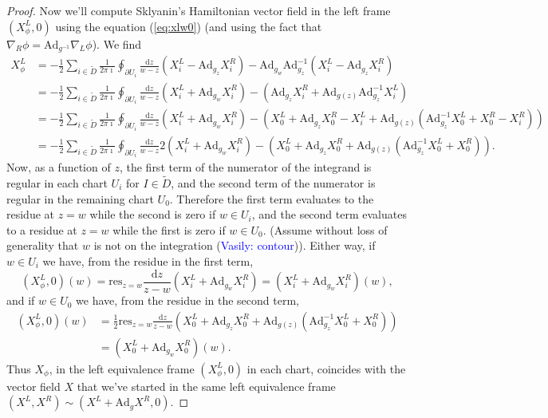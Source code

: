 \documentclass[11pt, oneside, reqno]{amsart}
\theoremstyle{definition} \newtheorem{definition}{Definition}[section]
\theoremstyle{definition} \newtheorem{remark}[definition]{Remark}
\theoremstyle{definition} \newtheorem{remarks}[definition]{Remarks}
\theoremstyle{definition} \newtheorem{question}[definition]{Question}
\theoremstyle{definition} \newtheorem*{note}{Note}
\theoremstyle{definition} \newtheorem{example}[definition]{Example}
\theoremstyle{definition} \newtheorem{examples}[definition]{Examples}
\newcommand{\mr}[1]{\mathrm{#1}}
\renewcommand{\d}{\mathrm{d}}
\newcommand{\Ad}{\mr{Ad}}
\newcommand{\vasily}[1]{(\textcolor{blue}{Vasily: #1})}
\begin{document}
\begin{proof}
Now we'll compute Sklyanin's Hamiltonian vector field in the left frame $(X_{\phi}^{L}, 0)$ using the equation (\ref{eq:xlw0}) (and using the fact that $\nabla_{R} \phi  = \Ad_{g^{-1}} \nabla_{L} \phi$).  We find
\begin{align*}
  X^{L}_\phi &= -\frac 1 2 \sum_{i \in \tilde D} \frac{1}{2 \pi \imath} \oint_{\partial U_i}
  \frac{\d z}{w - z}  (X_i^{L} - \Ad_{g_z} X_i^{R})  - \Ad_{g_w} \Ad_{g_z}^{-1} (X_i^{L} - \Ad_{g_z} X_i^{R}) \\
&=  -\frac 1 2 \sum_{i \in \tilde D} \frac{1}{2 \pi \imath} \oint_{\partial U_i}
\frac{\d z}{w - z}  (X_i^{L}  + \Ad_{g_w} X_i^{R}) - (\Ad_{g_z} X_i^{R} +  \Ad_{g(z)} \Ad_{g_{z}}^{-1} X_i^{L}) \\
 &= -\frac 1 2  \sum_{i \in \tilde D} \frac{1}{2 \pi \imath} \oint_{\partial U_i}
 \frac{\d z}{w - z}  (X_i^{L}  + \Ad_{g_w} X_i^{R}) - (X_0^{L} + \Ad_{g_z} X_0^{R}- X_{i}^{L} +  \Ad_{g(z)} ( \Ad_{g_{z}}^{-1} X_0^{L} + X_0^{R} - X_{i}^{R})) \\
  &= -\frac 1 2  \sum_{i \in \tilde D} \frac{1}{2 \pi \imath} \oint_{\partial U_i}
    \frac{\d z}{w - z} 2 (X_i^{L}  + \Ad_{g_w} X_i^{R}) - (X_0^{L} + \Ad_{g_z} X_0^{R} +  \Ad_{g(z)} ( \Ad_{g_{z}}^{-1} X_0^{L} + X_0^{R} )).
  \end{align*}
Now, as a function of $z$, the first term of the numerator of the integrand is regular in each chart $U_i$ for $I \in \tilde D$, and the second term of the numerator is regular in the remaining chart $U_0$. Therefore the first term evaluates to the residue at $z = w$ while the second is zero if $w \in U_i$, and the second term evaluates to a residue at $z = w$ while the first is zero if $w \in U_0$. (Assume without loss of generality that $w$ is not on the integration \vasily{contour}).  Either way, if $w \in U_i$ we have, from the residue in the first term,
  \[
    (X^{L}_\phi, 0)(w) = \mathrm{res}_{z = w} \frac{\d z}{ z - w} (X_{i}^{L} + \Ad_{g_w} X_{i}^{R}) =
    (X_{i}^{L} + \Ad_{g_w} X_{i}^{R})(w),
  \]
  and if $ w \in U_0$ we have, from the residue in the second term,
  \begin{align*}
    (X^{L}_\phi, 0)(w) &= \frac 1 2 \mathrm{res}_{z = w} \frac{\d z}{ z - w} (X_0^{L} + \Ad_{g_z} X_0^{R} +  \Ad_{g(z)} ( \Ad_{g_{z}}^{-1} X_0^{L} + X_0^{R} )) \\
    &= ( X_{0}^{L} + \Ad_{g_w} X_{0}^{R})(w).
  \end{align*}
  Thus $X_\phi$, in the left equivalence frame $(X^{L}_{\phi}, 0)$ in each chart, coincides with the vector field $X$ that we've started
  in the same left equivalence frame $(X^{L}, X^{R}) \sim (X^{L} + \Ad_{g} X^{R}, 0)$.
\end{proof}
\end{document}

